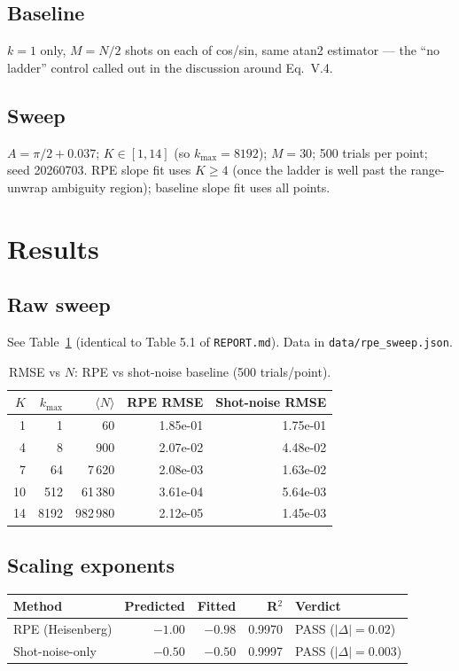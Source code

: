 \documentclass[11pt]{article}
\begin{document}
\subsection{Baseline}
$k=1$ only, $M=N/2$ shots on each of cos/sin, same atan2 estimator ---
the ``no ladder'' control called out in the discussion around Eq.~V.4.

\subsection{Sweep}
$A = \pi/2 + 0.037$; $K \in [1,14]$ (so $k_{\max} = 8192$); $M=30$; 500
trials per point; seed 20260703. RPE slope fit uses $K \ge 4$ (once the
ladder is well past the range-unwrap ambiguity region); baseline slope
fit uses all points.

\section{Results}

\subsection{Raw sweep}
See Table~\ref{tab:sweep} (identical to Table 5.1 of
\texttt{REPORT.md}). Data in \texttt{data/rpe\_sweep.json}.

\begin{table}[h]
\centering
\caption{RMSE vs $N$: RPE vs shot-noise baseline (500 trials/point).}
\label{tab:sweep}
\begin{tabular}{rrrrr}
\toprule
$K$ & $k_{\max}$ & $\langle N\rangle$ & RPE RMSE & Shot-noise RMSE \\
\midrule
 1 &    1 &      60 & 1.85e-01 & 1.75e-01 \\
 4 &    8 &     900 & 2.07e-02 & 4.48e-02 \\
 7 &   64 &   7\,620 & 2.08e-03 & 1.63e-02 \\
10 &  512 &  61\,380 & 3.61e-04 & 5.64e-03 \\
14 & 8192 & 982\,980 & 2.12e-05 & 1.45e-03 \\
\bottomrule
\end{tabular}
\end{table}

\subsection{Scaling exponents}
\begin{center}
\begin{tabular}{lrrrl}
\toprule
Method & Predicted & Fitted & R$^2$ & Verdict \\
\midrule
RPE (Heisenberg) & $-1.00$ & $\mathbf{-0.98}$ & 0.9970 & PASS ($|\Delta|=0.02$) \\
Shot-noise-only  & $-0.50$ & $\mathbf{-0.50}$ & 0.9997 & PASS ($|\Delta|=0.003$) \\
\bottomrule
\end{tabular}
\end{center}
\end{document}
